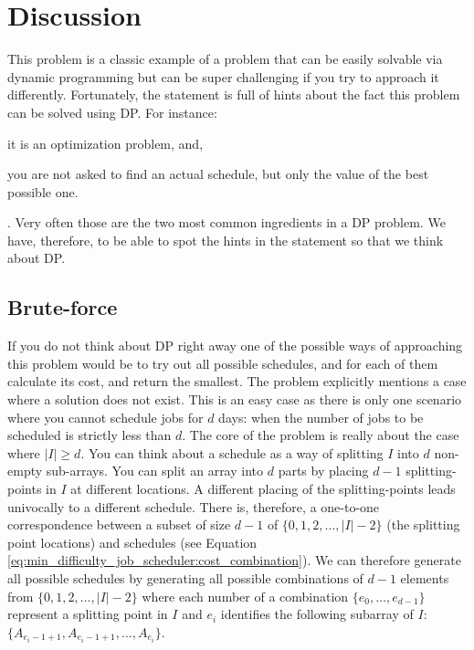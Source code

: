 \section{Discussion}
\label{min_difficulty_job_scheduler:sec:discussion}
This problem is a classic example of a problem that can be easily solvable via dynamic programming
but can be super challenging if you try to approach it differently. Fortunately, the statement is
full of hints about the fact this problem can be solved using DP. For instance:
\begin{enumerate*}
    \item it is an optimization problem, and,
    \item you are not asked to find an actual schedule, but only the value of the best possible one.
\end{enumerate*}. Very often those are the two most common ingredients in a DP problem. We have,
therefore, to be able to spot the hints in the statement so that we think about DP.



\subsection{Brute-force}
\label{min_difficulty_job_scheduler:sec:bruteforce}
If you do not think about DP right away one of the possible ways of approaching this problem would
be to try out all possible schedules, and for each of them calculate its cost, and return the
smallest. The problem explicitly mentions a case where a solution does not exist. This is an easy
case as there is only one scenario where you cannot schedule jobs for $d$ days: when the number of
jobs to be scheduled is strictly less than $d$. The core of the problem is really about the case
where $|I| \geq d$. You can think about a schedule as a way of splitting $I$ into $d$ non-empty
sub-arrays. You can split an array into $d$ parts by placing $d-1$ splitting-points in $I$ at
different locations. A different placing of the splitting-points leads univocally to a different
schedule. There is, therefore, a one-to-one correspondence between a subset of size $d-1$ of
$\{0,1,2, \ldots, |I|-2\}$ (the splitting point locations) and schedules (see Equation
\ref{eq:min_difficulty_job_scheduler:cost_combination}). We can therefore generate all possible
schedules by generating all possible combinations of $d-1$ elements from $\{0,1,2, \ldots, |I|-2\}$
where each number of a combination  $\{e_0, \ldots, e_{d-1}\}$ represent a splitting point in $I$
and $e_i$ identifies the following subarray of $I$: $\{A_{e_i-1+1}, A_{e_i-1+1}, \ldots ,
A_{e_i}\}$.


